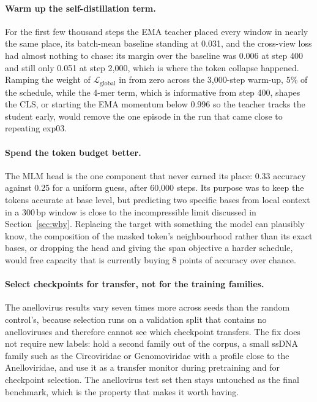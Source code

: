 \documentclass[10pt,twocolumn,a4paper]{article}
\begin{document}
\paragraph{Warm up the self-distillation term.}
For the first few thousand steps the EMA teacher placed every window in nearly
the same place, its batch-mean baseline standing at 0.031, and the cross-view
loss had almost nothing to chase: its margin over the baseline was 0.006 at step
400 and still only 0.051 at step 2{,}000, which is where the token collapse
happened. Ramping the weight of $\mathcal{L}_{\text{global}}$ in from zero across
the 3{,}000-step warm-up, 5\% of the schedule, while the 4-mer term, which is
informative from step 400, shapes the CLS, or starting the EMA momentum below
0.996 so the teacher tracks the student early, would remove the one episode in
the run that came close to repeating exp03.

\paragraph{Spend the token budget better.}
The MLM head is the one component that never earned its place: 0.33 accuracy
against 0.25 for a uniform guess, after 60{,}000 steps. Its purpose was to keep
the tokens accurate at base level, but predicting two specific bases from local
context in a 300\,bp window is close to the incompressible limit discussed in
Section~\ref{sec:why}. Replacing the target with something the model can
plausibly know, the composition of the masked token's neighbourhood rather than
its exact bases, or dropping the head and giving the span objective a harder
schedule, would free capacity that is currently buying 8 points of accuracy over
chance.

\paragraph{Select checkpoints for transfer, not for the training families.}
The anellovirus results vary seven times more across seeds than the random
control's, because selection runs on a validation split that contains no
anelloviruses and therefore cannot see which checkpoint transfers. The fix does
not require new labels: hold a second family out of the corpus, a small ssDNA
family such as the Circoviridae or Genomoviridae with a profile close to the
Anelloviridae, and use it as a transfer monitor during pretraining and for
checkpoint selection. The anellovirus test set then stays untouched as the final
benchmark, which is the property that makes it worth having.
\end{document}
